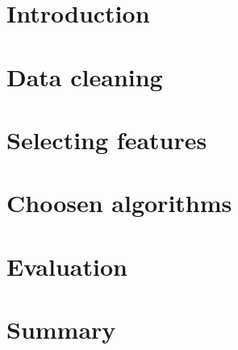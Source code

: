 \section{Introduction}

    

\section{Data cleaning}

    

\section{Selecting features}

    

\section{Choosen algorithms}

    

\section{Evaluation}

    

\section{Summary}

    